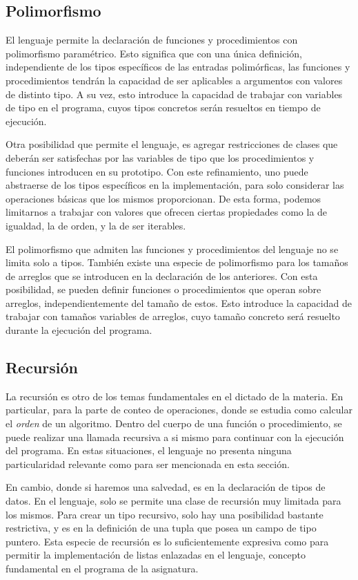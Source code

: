\subsection{Polimorfismo}

El lenguaje permite la declaración de funciones y procedimientos con polimorfismo paramétrico.
Esto significa que con una única definición, independiente de los tipos específicos de las entradas polimórficas, las funciones y procedimientos tendrán la capacidad de ser aplicables a argumentos con valores de distinto tipo.
A su vez, esto introduce la capacidad de trabajar con variables de tipo en el programa, cuyos tipos concretos serán resueltos en tiempo de ejecución.

Otra posibilidad que permite el lenguaje, es agregar restricciones de clases que deberán ser satisfechas por las variables de tipo que los procedimientos y funciones introducen en su prototipo.
Con este refinamiento, uno puede abstraerse de los tipos específicos en la implementación, para solo considerar las operaciones básicas que los mismos proporcionan.
De esta forma, podemos limitarnos a trabajar con valores que ofrecen ciertas propiedades como la de igualdad, la de orden, y la de ser iterables.

El polimorfismo que admiten las funciones y procedimientos del lenguaje no se limita solo a tipos.
También existe una especie de polimorfismo para los tamaños de arreglos que se introducen en la declaración de los anteriores.
Con esta posibilidad, se pueden definir funciones o procedimientos que operan sobre arreglos, independientemente del tamaño de estos.
Esto introduce la capacidad de trabajar con tamaños variables de arreglos, cuyo tamaño concreto será resuelto durante la ejecución del programa.

\subsection{Recursión}

La recursión es otro de los temas fundamentales en el dictado de la materia.
En particular, para la parte de conteo de operaciones, donde se estudia como calcular el \textit{orden} de un algoritmo.
Dentro del cuerpo de una función o procedimiento, se puede realizar una llamada recursiva a si mismo para continuar con la ejecución del programa.
En estas situaciones, el lenguaje no presenta ninguna particularidad relevante como para ser mencionada en esta sección.

En cambio, donde si haremos una salvedad, es en la declaración de tipos de datos.
En el lenguaje, solo se permite una clase de recursión muy limitada para los mismos.
Para crear un tipo recursivo, solo hay una posibilidad bastante restrictiva, y es en la definición de una tupla que posea un campo de tipo puntero.
Esta especie de recursión es lo suficientemente expresiva como para permitir la implementación de listas enlazadas en el lenguaje, concepto fundamental en el programa de la asignatura.

